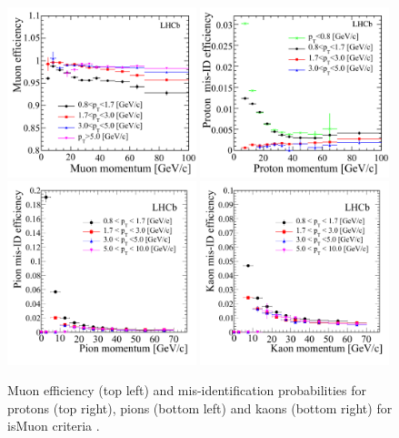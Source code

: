 \begin{figure}[htb] 
  \centering    
  \includegraphics[width=0.49\textwidth]{./Figs/LHC_LHCb/hidef_Fig41topleft.png}
  \includegraphics[width=0.49\textwidth]{./Figs/LHC_LHCb/hidef_Fig41topright.png}
  \includegraphics[width=0.49\textwidth]{./Figs/LHC_LHCb/hidef_Fig41bottomleft.png}
  \includegraphics[width=0.49\textwidth]{./Figs/LHC_LHCb/hidef_Fig41bottomright.png}
  \caption{Muon efficiency (top left) and mis-identification probabilities for protons (top right), pions (bottom left) and kaons (bottom right) for isMuon criteria \cite{Archilli:2013npa}. }
  \label{fig:isMuon_efficiency}
\end{figure}




